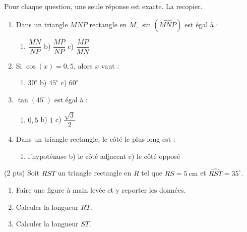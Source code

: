 \documentclass[11pt]{article}
\begin{document}
\begin{exercice}[QCM]
Pour chaque question, une seule réponse est exacte. La recopier.
\begin{enumerate}
  \item Dans un triangle $MNP$ rectangle en $M$, $\sin(\widehat{MNP})$ est égal à :
  \begin{enumerate}
    \item[a)] $\dfrac{MN}{NP}$ \quad b) $\dfrac{MP}{NP}$ \quad c) $\dfrac{MP}{MN}$
  \end{enumerate}
  \item Si $\cos(x) = 0{,}5$, alors $x$ vaut :
  \begin{enumerate}
    \item[a)] $30^\circ$ \quad b) $45^\circ$ \quad c) $60^\circ$
  \end{enumerate}
  \item $\tan(45^\circ)$ est égal à :
  \begin{enumerate}
    \item[a)] $0{,}5$ \quad b) $1$ \quad c) $\dfrac{\sqrt{3}}{2}$
  \end{enumerate}
  \item Dans un triangle rectangle, le côté le plus long est :
  \begin{enumerate}
    \item[a)] l'hypoténuse \quad b) le côté adjacent \quad c) le côté opposé
  \end{enumerate}
\end{enumerate}
\end{exercice}

\begin{exercice} \hfill (2 pts)
Soit $RST$ un triangle rectangle en $R$ tel que $RS = \SI{5}{\centi\meter}$ et $\widehat{RST} = 35^\circ$.
\begin{enumerate}
  \item Faire une figure à main levée et y reporter les données.
  \item Calculer la longueur $RT$.
  \item Calculer la longueur $ST$.
\end{enumerate}
\end{exercice}
\end{document}
